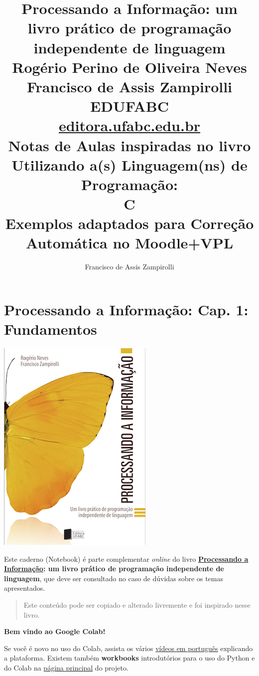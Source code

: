 \documentclass[12pt,a4paper]{article}
\title{Processando a Informação: um livro prático de programação independente de linguagem 
\\\large\vspace{2cm}
Rogério Perino de Oliveira Neves 
\\\vspace{5mm}
Francisco de Assis Zampirolli
\\\large\vspace{2cm}
EDUFABC
\\ \url{editora.ufabc.edu.br}
\\\Huge\vspace{3cm}
Notas de Aulas inspiradas no livro
\\\Large\vspace{1cm}
Utilizando a(s) Linguagem(ns) de Programação: 
\\\Huge\vspace{1cm}
C
\\\large\vspace{1cm}
Exemplos adaptados para Correção Automática no Moodle+VPL
\vspace{2cm}}
\author{Francisco de Assis Zampirolli\vspace{1cm}}
\begin{document}
    
    
\clearpage\maketitle
\thispagestyle{empty}
\tableofcontents

    
    

    
    \hypertarget{processando-a-informauxe7uxe3o-cap.-1-fundamentos}{%
\section{Processando a Informação: Cap. 1:
Fundamentos}\label{processando-a-informauxe7uxe3o-cap.-1-fundamentos}}

    \includegraphics{"figs/Capa_Processando_Informacao.jpg"}

Este caderno (Notebook) é parte complementar \emph{online} do livro
\textbf{\href{https://editora.ufabc.edu.br/matematica-e-ciencias-da-computacao/58-processando-a-informacao}{Processando
a Informação}: um livro prático de programação independente de
linguagem}, que deve ser consultado no caso de dúvidas sobre os temas
apresentados.

\begin{quote}
Este conteúdo pode ser copiado e alterado livremente e foi inspirado
nesse livro.
\end{quote}

    \textbf{Bem vindo ao Google Colab!}

Se você é novo no uso do Colab, assista os vários
\href{https://www.youtube.com/results?search_query=introdu\%C3\%A7\%C3\%A3o+ao+colab}{vídeos
em português} explicando a plataforma. Existem também \textbf{workbooks}
introdutórios para o uso do Python e do Colab na
\href{https://colab.research.google.com/}{página principal} do projeto.
\end{document}
